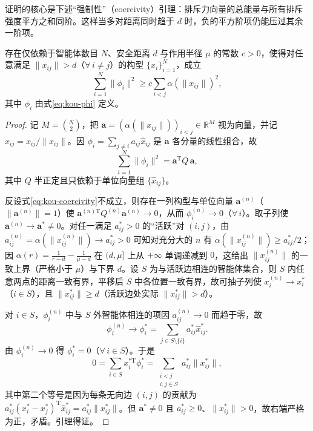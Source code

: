 证明的核心是下述``强制性''（coercivity）引理：排斥力向量的总能量与所有排斥强度平方之和同阶。这样当多对距离同时趋于 $d$ 时，负的平方阶项仍能压过其余一阶项。

\begin{lemma}[排斥力的强制性]\label{lem:kou-coercivity}
存在仅依赖于智能体数目 $N$、安全距离 $d$ 与作用半径 $\mu$ 的常数 $c>0$，使得对任意满足 $\|x_{ij}\|>d$（$\forall\,i\neq j$）的构型 $\{x_i\}_{i=1}^{N}$，成立
\begin{equation}
\sum_{i=1}^{N}\|\phi_i\|^2\ge c\sum_{i<j}\alpha(\|x_{ij}\|)^2, \label{eq:kou-coercivity}
\end{equation}
其中 $\phi_i$ 由式\eqref{eq:kou-phi} 定义。
\end{lemma}

\begin{proof}
记 $M=\binom{N}{2}$，把 $\mathbf a=(\alpha(\|x_{ij}\|))_{i<j}\in\mathbb{R}^{M}$ 视为向量，并记 $\hat{x}_{ij}=x_{ij}/\|x_{ij}\|$。因 $\phi_i=\sum_{j\neq i}a_{ij}\hat{x}_{ij}$ 是 $\mathbf a$ 各分量的线性组合，故
\begin{equation}
\sum_{i=1}^{N}\|\phi_i\|^2=\mathbf a^{\mathrm{T}}Q\,\mathbf a,
\end{equation}
其中 $Q$ 半正定且只依赖于单位向量组 $\{\hat{x}_{ij}\}$。

反设式\eqref{eq:kou-coercivity}不成立，则存在一列构型与单位向量 $\mathbf a^{(n)}$（$\|\mathbf a^{(n)}\|=1$）使 $\mathbf a^{(n)\mathrm{T}}Q^{(n)}\mathbf a^{(n)}\to0$，从而 $\phi_i^{(n)}\to0$（$\forall\,i$）。取子列使 $\mathbf a^{(n)}\to\mathbf a^{\ast}\neq0$。对任一满足 $a_{ij}^{\ast}>0$ 的``活跃''对 $(i,j)$，由 $a_{ij}^{(n)}=\alpha(\|x_{ij}^{(n)}\|)\to a_{ij}^{\ast}>0$ 可知对充分大的 $n$ 有 $\alpha(\|x_{ij}^{(n)}\|)\ge a_{ij}^{\ast}/2$；因 $\alpha(r)=\tfrac{1}{r-d}-\tfrac{1}{\mu-d}$ 在 $(d,\mu]$ 上从 $+\infty$ 单调递减到 $0$，这给出 $\|x_{ij}^{(n)}\|$ 的一致上界（严格小于 $\mu$）与下界 $d$。设 $S$ 为与活跃边相连的智能体集合，则 $S$ 内任意两点的距离一致有界，平移后 $S$ 中各位置一致有界，故可抽子列使 $x_i^{(n)}\to x_i^{\ast}$（$i\in S$），且 $\|x_{ij}^{\ast}\|\ge d$（活跃边处实际 $\|x_{ij}^{\ast}\|>d$）。

对 $i\in S$，$\phi_i^{(n)}$ 中与 $S$ 外智能体相连的项因 $a_{ij}^{(n)}\to0$ 而趋于零，故
\begin{equation}
\phi_i^{(n)}\to\phi_i^{\ast}=\sum_{j\in S\setminus\{i\}}a_{ij}^{\ast}\hat{x}_{ij}^{\ast}.
\end{equation}
由 $\phi_i^{(n)}\to0$ 得 $\phi_i^{\ast}=0$（$\forall\,i\in S$）。于是
\begin{equation}
0=\sum_{i\in S}x_i^{\ast\mathrm{T}}\phi_i^{\ast}
=\sum_{\substack{i<j\\ i,j\in S}}a_{ij}^{\ast}\|x_{ij}^{\ast}\|,
\end{equation}
其中第二个等号是因为每条无向边 $(i,j)$ 的贡献为 $a_{ij}^{\ast}(x_i^{\ast}-x_j^{\ast})^{\mathrm{T}}\hat{x}_{ij}^{\ast}=a_{ij}^{\ast}\|x_{ij}^{\ast}\|$。但 $\mathbf a^{\ast}\neq0$ 且 $a_{ij}^{\ast}\ge0$、$\|x_{ij}^{\ast}\|>0$，故右端严格为正，矛盾。引理得证。
\end{proof}

